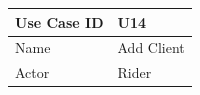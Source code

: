 \documentclass[12pt]{article}
\begin{document}
\begin{table}[H]
\begin{tabular}{|l|l|}
\hline
Use Case ID & U14                                                                                                                                                                                                                                                                                                                                                                                                                                                                                                                                                                                                                                                                                                                                                                                                                                  \\ \hline
Name        & Add Client                                                                                                                                                                                                                                                                                                                                                                                                                                                                                                                                                                                                                                                                                                                                                                                                                           \\ \hline
Actor       & Rider                                                                                                                                                                                                                                                                                                                                                                                                                                                                                                                                                                                                                                                                                                                                                                                                                                \\ \hline

\end{tabular}
\end{table}
\end{document}

